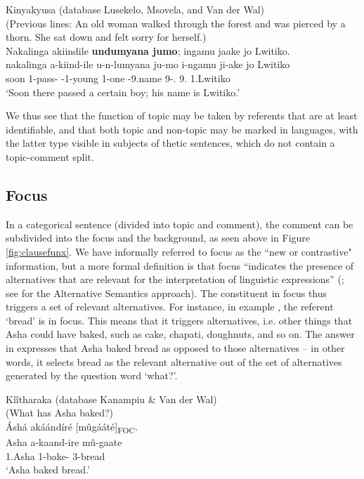 \documentclass[output=paper]{langscibook}
\begin{document}
\ea
\label{ex:kinyakyusa:pstvbsubj}
Kinyakyusa (database Lusekelo, Msovela, and Van der Wal)\\
(Previous lines: An old woman walked through the forest and was pierced by a thorn. She sat down and felt sorry for herself.)\\
Nakalinga akiindile \textbf{undumyana jumo}; ingamu jaake jo Lwitiko.\\
\gll
nakalinga  a-kiind-ile  u-n-lumyana  ju-mo  i-ngamu  ji-ake  jo  Lwitiko\\
soon  1\SM{}-pass-\PFV{}  \AUG{}-1-young  1-one  \AUG{}-9.name  9-\POSS.\SG{}  9.\IDCOP{}  1.Lwitiko\\
\glt
‘Soon there passed a certain boy; his name is Lwitiko.’\\


\z

We thus see that the function of topic may be taken by referents that are at least identifiable, and that both topic and non-topic may be marked in languages, with the latter type visible in subjects of thetic sentences, which do not contain a topic-comment split.

\subsection{Focus}

In a categorical sentence (divided into topic and comment), the comment can be subdivided into the focus and the background, as seen above in Figure \ref{fig:clausefunx}. We have informally referred to focus as the ``new or contrastive" information, but a more formal definition is that focus “indicates the presence of alternatives that are relevant for the interpretation of linguistic expressions” (\citealt[7]{KrifkaMusan2012}; see \citealt{Rooth1992,Rooth1996,Rooth1985} for the Alternative Semantics approach). The constituent in focus thus triggers a set of relevant alternatives. For instance, in example , the referent ‘bread’ is in focus. This means that it triggers alternatives, i.e. other things that Asha could have baked, such as cake, chapati, doughnuts, and so on. The answer in  expresses that Asha baked bread as opposed to those alternatives – in other words, it selects bread as the relevant alternative out of the set of alternatives generated by the question word ‘what?’.\largerpage

\ea
\label{ex:kiitharaka:ashabread}
Kîîtharaka (database Kanampiu \& Van der Wal)\\
(What has Asha baked?)\\
Áshá akáándíré [mûgááté]\textsubscript{FOC}.\\
\gll
Asha   a-kaand-ire   mû-gaate\\
1.Asha   1\SM{}-bake-\PFV{}   3-bread\\
\glt
‘Asha baked bread.’\\
\end{document}
